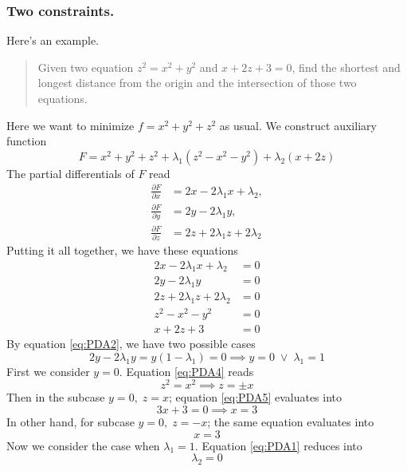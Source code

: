 \documentclass[../../Main.tex]{subfiles}
\begin{document}
\subsubsection{Two constraints.} Here's an example.
\begin{quotation}
    Given two equation $z^2=x^2+y^2$ and $x+2z+3=0$, find the shortest and longest distance from the origin and the intersection of those two equations.
\end{quotation}
Here we want to minimize $f=x^2+y^2+z^2$ as usual. We construct auxiliary function
\begin{equation*}
    F=x^2+y^2+z^2+\lambda_1(z^2-x^2-y^2)+\lambda_2(x+2z)
\end{equation*}
The partial differentials of $F$ read
\begin{align*}
    \frac{\partial F}{\partial x}&=2x-2\lambda_1x+\lambda_2,\\
    \frac{\partial F}{\partial y}&=2y-2\lambda_1y,\\
    \frac{\partial F}{\partial z}&=2z+2\lambda_1z+2\lambda_2
\end{align*}
Putting it all together, we have these equations
\begin{align}
    2x-2\lambda_1x+\lambda_2&=0\label{eq:PDA1}\\
    2y-2\lambda_1y&=0\label{eq:PDA2}\\
    2z+2\lambda_1z+2\lambda_2&=0\label{eq:PDA3}\\
    z^2-x^2-y^2&=0\label{eq:PDA4}\\
    x+2z+3&=0\label{eq:PDA5}
\end{align}
By equation \ref{eq:PDA2}, we have two possible cases
\begin{equation*}
    2y-2\lambda_1y=y(1-\lambda_1)=0\implies y=0\;\lor\;\lambda_1=1
\end{equation*}
First we consider $y=0$. Equation \ref{eq:PDA4} reads
\begin{equation*}
    z^2=x^2\implies z=\pm x
\end{equation*}
Then in the subcase $y=0,\;z=x$; equation \ref{eq:PDA5} evaluates into
\begin{equation*}
    3x+3=0\implies x=3
\end{equation*}
In other hand, for subcase $y=0,\;z=-x$; the same equation evaluates into
\begin{equation*}
    x=3
\end{equation*}
Now we consider the case when $\lambda_1=1$. Equation \ref{eq:PDA1} reduces into 
\begin{equation*}
    \lambda_2=0
\end{equation*}
\end{document}

